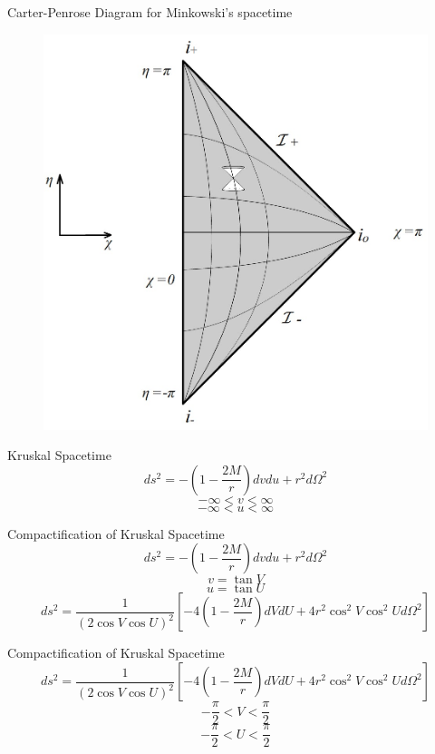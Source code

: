 \documentclass{beamer}
\begin{document}
        \begin{frame}{Carter-Penrose Diagram for Minkowski's spacetime}
        	\begin{center}
				\begin{figure}
				\includegraphics[scale=0.75] {fig15.jpg}
				\end{figure}
			\end{center}	
        \end{frame}
		
        \begin{frame}{Kruskal Spacetime}
        	$$ ds^2 = -\left( 1 - \frac{2M}{r} \right) dvdu + r^2 d\Omega^2 $$
			\pause
			$$ -\infty<  v  <\infty $$
			$$ -\infty<  u  <\infty $$
        \end{frame}
        
        \begin{frame}{Compactification of Kruskal Spacetime}
        	$$ ds^2 = -\left( 1 - \frac{2M}{r} \right) dvdu + r^2 d\Omega^2 $$
			\pause
			$$ v  =  \tan V $$
			$$ u  =  \tan U $$
            \pause
            $$ ds^2 = \frac{1}{\left(2\cos V\cos U\right)^2}\left[-4\left(1-\frac{2M}{r}\right)dVdU + 4r^2 \cos^2 V\cos^2U d\Omega^2 \right]$$
        \end{frame}
        
        \begin{frame}{Compactification of Kruskal Spacetime}
        	$$ ds^2 = \frac{1}{\left(2\cos V\cos U\right)^2}\left[-4\left(1-\frac{2M}{r}\right)dVdU + 4r^2 \cos^2 V\cos^2U d\Omega^2 \right]$$
			\pause
			$$ -\frac{\pi}{2}<  V  <\frac{\pi}{2}$$
			$$ -\frac{\pi}{2}<  U  <\frac{\pi}{2}$$
        \end{frame}
        
\end{document}
